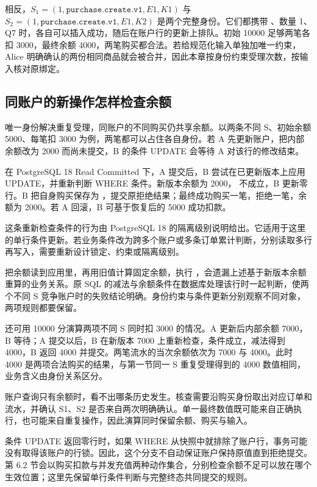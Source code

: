 相反，\(S_1=(1,\texttt{purchase.create.v1},E1,K1)\) 与 \(S_2=(1,\texttt{purchase.create.v1},E1,K2)\) 是两个完整身份。它们都携带 、数量 1、Q7 时，各自可以插入成功，随后在账户行的更新上排队。初始 10000 足够两笔各扣 3000，最终余额 4000，两笔购买都合法。若给规范化输入单独加唯一约束，Alice 明确确认的两份相同商品就会被合并，因此本章按身份约束受理次数，按输入核对原绑定。

\subsection*{同账户的新操作怎样检查余额}

唯一身份解决重复受理，同账户的不同购买仍共享余额。以两条不同 S、初始余额 5000、每笔扣 3000 为例，两笔都可以占住各自身份。若 A 先更新账户，把内部余额改为 2000 而尚未提交，B 的条件 UPDATE 会等待 A 对该行的修改结束。

在 PostgreSQL 18 Read Committed 下，A 提交后，B 尝试在已更新版本上应用 UPDATE，并重新判断 WHERE 条件。新版本余额为 2000， 不成立，B 更新零行。B 把自身购买保存为 ，提交原拒绝结果；最终成功购买一笔，拒绝一笔，余额为 2000。若 A 回滚，B 可基于恢复后的 5000 成功扣款。



这条重新检查条件的行为由 PostgreSQL 18 的隔离级别说明给出\cite{pg}。它适用于这里的单行条件更新。若业务条件改为跨多个账户或多条订单累计判断，分别读取多行再写入，需要重新设计锁定、约束或隔离级别。

把余额读到应用里，再用旧值计算固定余额，执行 ，会遗漏上述基于新版本余额重算的业务关系。原 SQL 的减法与余额条件在数据库处理该行时一起判断，使两个不同 S 竞争账户时的失败结论明确。身份约束与条件更新分别观察不同对象，两项规则都要保留。

还可用 10000 分演算两项不同 S 同时扣 3000 的情况。A 更新后内部余额 7000，B 等待；A 提交以后，B 在新版本 7000 上重新检查，条件成立，减法得到 4000，B 返回 4000 并提交。两笔流水的当次余额依次为 7000 与 4000。此时 4000 是两项合法购买的结果，与第一节同一 S 重复受理得到的 4000 数值相同，业务含义由身份关系区分。

账户查询只有余额时，看不出哪条历史发生。核查需要沿购买身份取出对应订单和流水，并确认 S1、S2 是否来自两次明确确认。单一最终数值既可能来自正确执行，也可能来自重复操作，因此演算同时保留余额、购买与输入。

条件 UPDATE 返回零行时，如果 WHERE 从快照中就排除了账户行，事务可能没有取得该账户的行锁。因此，这个分支不自动保证账户保持原值直到拒绝提交。第 6.2 节会以购买扣款与并发充值两种动作集合，分别检查余额不足可以放在哪个生效位置；这里先保留单行条件判断与完整终态共同提交的规则。

